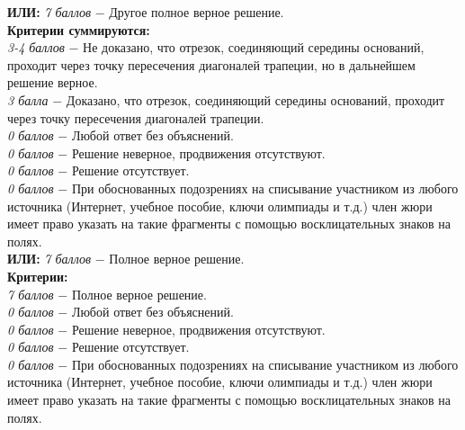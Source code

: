 \textbf{ИЛИ:}
\textit{7 баллов} $-$ Другое полное верное решение.\\



 \textbf{Критерии суммируются:} \\
\textit{3-4 баллов} $-$ Не доказано, что отрезок, соединяющий середины оснований, проходит через точку пересечения диагоналей трапеции, но в дальнейшем решение верное.\\
\textit{3 балла} $-$ Доказано, что отрезок, соединяющий середины оснований, проходит через точку пересечения диагоналей трапеции.\\
\textit{0 баллов} $-$ Любой ответ без объяснений.\\
\textit{0 баллов} $-$ Решение неверное, продвижения отсутствуют.\\
\textit{0 баллов} $-$ Решение отсутствует.\\
\textit{0 баллов} $-$ При обоснованных подозрениях на списывание участником из любого источника (Интернет, учебное пособие, ключи олимпиады и т.д.) член жюри имеет право указать на такие фрагменты с помощью восклицательных знаков на полях.\\

\textbf{ИЛИ:}
\textit{7 баллов} $-$ Полное верное решение.\\


 \textbf{Критерии:} \\
\textit{7 баллов} $-$ Полное верное решение.\\
\textit{0 баллов} $-$ Любой ответ без объяснений.\\
\textit{0 баллов} $-$ Решение неверное, продвижения отсутствуют.\\
\textit{0 баллов} $-$ Решение отсутствует.\\
\textit{0 баллов} $-$ При обоснованных подозрениях на списывание участником из любого источника (Интернет, учебное пособие, ключи олимпиады и т.д.) член жюри имеет право указать на такие фрагменты с помощью восклицательных знаков на полях. \\